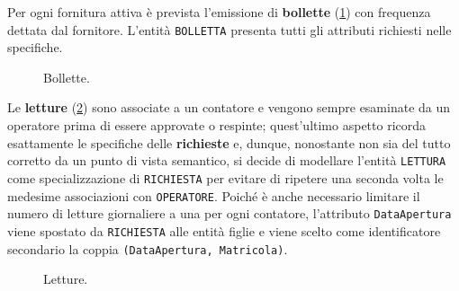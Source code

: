 \documentclass[a4paper,12pt]{report}
\begin{document}
Per ogni fornitura attiva è prevista l'emissione di \textbf{bollette} (\cref{fig:reports}) con frequenza dettata dal fornitore. L'entità \texttt{BOLLETTA} presenta tutti gli attributi richiesti nelle specifiche.

\begin{figure}[H]
\centering{}
%
\caption{Bollette.}
\label{fig:reports}
\end{figure}


Le \textbf{letture} (\cref{fig:measurements}) sono associate a un contatore e vengono sempre esaminate da un operatore prima di essere approvate o respinte; quest'ultimo aspetto ricorda esattamente le specifiche delle \textbf{richieste} e, dunque, nonostante non sia del tutto corretto da un punto di vista semantico, si decide di modellare l'entità \texttt{LETTURA} come specializzazione di \texttt{RICHIESTA} per evitare di ripetere una seconda volta le medesime associazioni con \texttt{OPERATORE}. Poiché è anche necessario limitare il numero di letture giornaliere a una per ogni contatore, l'attributo \texttt{DataApertura} viene spostato da \texttt{RICHIESTA} alle entità figlie e viene scelto come identificatore secondario la coppia \texttt{(DataApertura, Matricola)}.

\begin{figure}[H]
\centering{}
%
\caption{Letture.}
\label{fig:measurements}
\end{figure}
\end{document}
